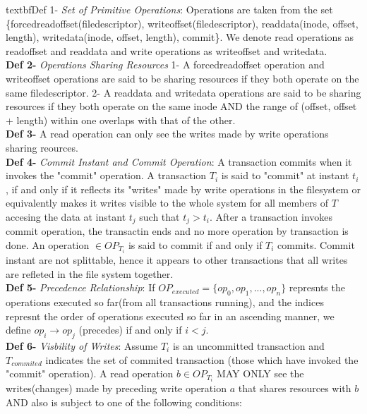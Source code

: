 \documentclass[a4paper, 11pt]{article}
\begin{document}
textbf{Def 1-} \emph{Set of Primitive Operations}: Operations are taken from the set \{forcedreadoffset(filedescriptor), writeoffset(filedescriptor), readdata(inode, offset, length), writedata(inode, offset, length), commit\}. We denote read operations as readoffset and readdata and write operations as writeoffset and writedata.\\

\textbf{Def 2-} \emph{Operations Sharing Resources} 1- A forcedreadoffset operation and writeoffset operations are said to be sharing resources if they both operate on the same filedescriptor. 2- A readdata and writedata operations are said to be sharing resources if they both operate on the same inode AND the range of (offset, offset + length) within one overlaps with that of the other.\\ 

\textbf{Def 3-} A read operation can only see the writes made by write operations sharing reources.\\ 

\textbf{Def 4-} \emph{Commit Instant and Commit Operation}: A transaction commits when it invokes the "commit" operation. A transaction $T_i$ is said to "commit" at instant $t_i$, if and only if it reflects its "writes" made by write operations in the filesystem or equivalently makes it writes visible to the whole system for all members of $T$ accesing the data at instant $t_j$ such that $t_j > t_i$. After a transaction invokes commit operation, the transactin ends and no more operation by transaction is done. An operation $\in OP_{T_i}$ is said to commit if and only if $T_i$ commits. Commit instant are not splittable, hence it appears to other transactions that all writes are refleted in the file system together.\\ 

\textbf{Def 5-} \emph{Precedence Relationship}: If $OP_{executed} = \{op_0, op_1, ..., op_n\}$ represnts the operations executed so far(from all transactions running), and the indices represnt the order of operations executed so far in an ascending manner, we define $op_i \rightarrow op_j$ (precedes) if and only if $i<j$.\\ 

\textbf{Def 6-} \emph{Visbility of Writes}: Assume $T_i$ is an uncommitted transaction and $T_{commited}$ indicates the set of commited transaction (those which have invoked the "commit" operation). A read operation $b \in OP_{T_i}$ MAY ONLY see the writes(changes) made by preceding write operation $a$ that shares resources with $b$ AND also is subject to one of the following conditions:\\
\end{document}

